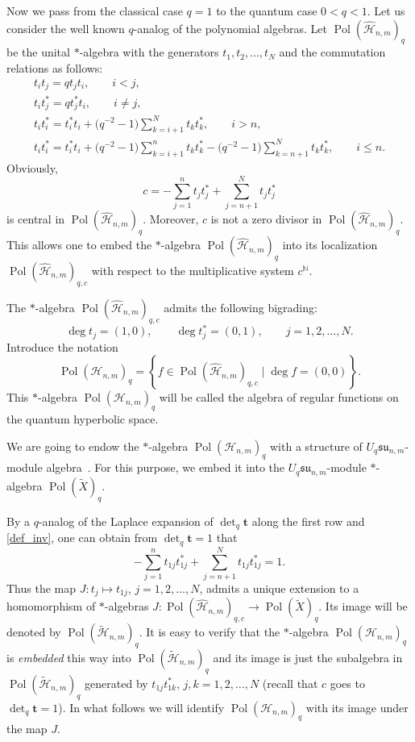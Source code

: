 \documentclass[pdftex]{sigma}
\begin{document}
Now we pass from the classical case $q=1$ to the quantum case $0<q<1$. Let us consider the well known
\cite{RTF} $q$-analog of the polynomial algebras. Let $\operatorname{Pol}(\widehat{\mathscr{H}}_{n,m})_q$
be the unital $*$-algebra with the generators $t_1,t_{2},\ldots,t_N$ and the commutation relations as
follows:
\begin{gather*}
t_it_j = qt_jt_i,\qquad i<j,
\\ t_it_j^* = qt_j^*t_i,\qquad i\ne j,
\\ t_it_i^* = t_i^*t_i+\big(q^{-2}-1\big)\sum_{k=i+1}^Nt_kt_k^*,\qquad i>n,
\\ t_it_i^* = t_i^*t_i+\big(q^{-2}-1\big)\sum_{k=i+1}^nt_kt_k^*-
\big(q^{-2}-1\big)\sum_{k=n+1}^Nt_kt_k^*,\qquad i\le n.
\end{gather*}
Obviously, \[c=-\sum_{j=1}^nt_jt_j^*+\sum_{j=n+1}^Nt_jt_j^*\] is central in
$\operatorname{Pol}(\widehat{\mathscr{H}}_{n,m})_q$. Moreover, $c$ is not a zero divisor in
$\operatorname{Pol}(\widehat{\mathscr{H}}_{n,m})_q$. This allows one to embed the $*$-algebra
$\operatorname{Pol}(\widehat{\mathscr{H}}_{n,m})_q$ into its localization
$\operatorname{Pol}(\widehat{\mathscr{H}}_{n,m})_{q,c}$ with respect to the multiplicative system
$c^{\mathbb{N}}$.

The $*$-algebra $\operatorname{Pol}(\widehat{\mathscr{H}}_{n,m})_{q,c}$ admits the following bigrading:
\[\deg t_{j}=(1,0),\qquad\deg t_j^*=(0,1),\qquad j=1,2,\ldots,N.\] Introduce the notation
\[
\operatorname{Pol}(\mathscr{H}_{n,m})_q=\left\{ f\in
\operatorname{Pol}(\widehat{\mathscr{H}}_{n,m})_{q,c} \; \big|\; \deg f=(0,0)\right\}.
\]
This $*$-algebra $\operatorname{Pol}(\mathscr{H}_{n,m})_q$ will be called the algebra of regular functions on
the quantum hyperbolic space.



We are going to endow the $*$-algebra $\operatorname{Pol}(\mathscr{H}_{n,m})_q$ with a structure of
$U_{q}\mathfrak{su}_{n,m}$-module algebra~\cite{Ch-P}. For this purpose, we embed it into the
$U_{q}\mathfrak{su}_{n,m}$-module $*$-algebra $\operatorname{Pol}(\widetilde{X})_q$.

By a $q$-analog of the Laplace expansion of $\det_q \mathbf{t}$ along the f\/irst row \cite[Section~9.2]{Kl-Sch} and
\eqref{def_inv}, one can obtain from $\det_q \mathbf{t}=1$ that
\[
-\sum_{j=1}^nt_{1j}t_{1j}^*+\sum_{j=n+1}^Nt_{1j}t_{1j}^*=1.
\]
Thus the map $J:t_j\mapsto t_{1j}$, $j=1,2,\ldots,N$, admits a unique extension to a homomorphism of
$*$-algebras $J:\operatorname{Pol}(\widehat{\mathscr{H}}_{n,m})_{q,c}\to
\operatorname{Pol}(\widetilde{X})_q$. Its image will be denoted by
$\operatorname{Pol}(\widetilde{\mathscr{H}}_{n,m})_q$. It is easy to verify that the $*$-algebra
$\operatorname{Pol}(\mathscr{H}_{n,m})_q$ is {\it embedded} this way into
$\operatorname{Pol}(\widetilde{\mathscr{H}}_{n,m})_q$ and its image is just the subalgebra in
$\operatorname{Pol}(\widetilde{\mathscr{H}}_{n,m})_q$ generated by $t_{1j}t_{1k}^*$, $j,k=1,2,\ldots,N$
(recall that $c$ goes to $\det_q \mathbf{t}=1$). In what follows we will identify
$\operatorname{Pol}(\mathscr{H}_{n,m})_q$ with its image under the map $J$.
\end{document}
